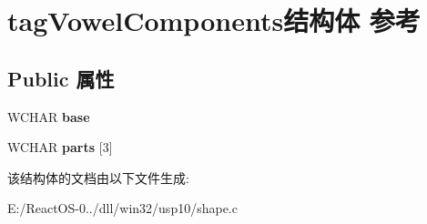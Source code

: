 \hypertarget{structtag_vowel_components}{}\section{tag\+Vowel\+Components结构体 参考}
\label{structtag_vowel_components}
\subsection*{Public 属性}
\begin{DoxyCompactItemize}
\item 
\mbox{\label{structtag_vowel_components_af080aa387b8eac7686b401e58dbc20d9}} 
W\+C\+H\+AR {\bfseries base}
\item 
\mbox{\label{structtag_vowel_components_a9a8481cb35c1ca1b620d75126de728ee}} 
W\+C\+H\+AR {\bfseries parts} \mbox{[}3\mbox{]}
\end{DoxyCompactItemize}


该结构体的文档由以下文件生成\+:\begin{DoxyCompactItemize}
\item 
E\+:/\+React\+O\+S-\/0../dll/win32/usp10/shape.\+c\end{DoxyCompactItemize}
